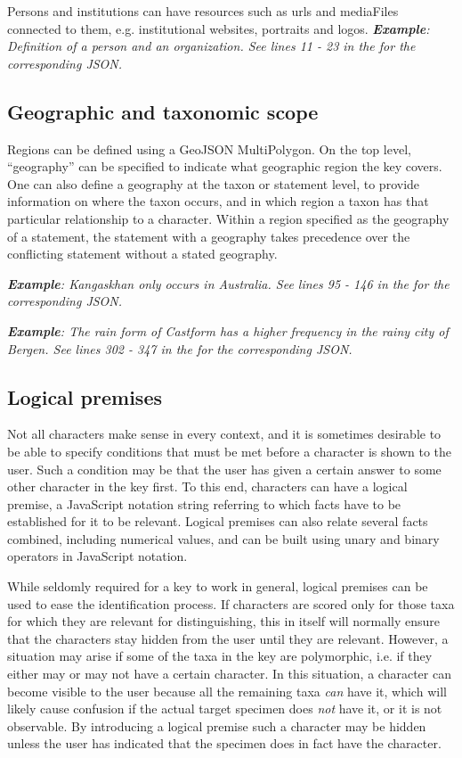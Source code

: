 \documentclass[10pt,letterpaper]{article}
\begin{document}
Persons and institutions can have resources such as urls and mediaFiles connected to them, e.g. institutional websites, portraits and logos.
\textit{\textbf{Example}: Definition of a person and an organization. See lines 11 - 23 in the  for the corresponding JSON.}
\subsection*{
Geographic and taxonomic scope
}
Regions can be defined using a GeoJSON MultiPolygon. On the top level, ``geography'' can be specified to indicate what geographic region the key covers. One can also define a geography at the taxon or statement level, to provide information on where the taxon occurs, and in which region a taxon has that particular relationship to a character. Within a region specified as the geography of a statement, the statement with a geography takes precedence over the conflicting statement without a stated geography.

\textit{\textbf{Example}: Kangaskhan only occurs in Australia. See lines 95 - 146 in the  for the corresponding JSON.}

\textit{\textbf{Example}: The rain form of Castform has a higher frequency in the rainy city of Bergen. See lines 302 - 347 in the  for the corresponding JSON.}
\subsection*{
Logical premises
}
Not all characters make sense in every context, and it is sometimes desirable to be able to specify conditions that must be met before a character is shown to the user. Such a condition may be that the user has given a certain answer to some other character in the key first. To this end, characters can have a logical premise, a JavaScript notation string referring to which facts have to be established for it to be relevant. Logical premises can also relate several facts combined, including numerical values, and can be built using unary and binary operators in JavaScript notation.

While seldomly required for a key to work in general, logical premises can be used to ease the identification process. If characters are scored only for those taxa for which they are relevant for distinguishing, this in itself will normally ensure that the characters stay hidden from the user until they are relevant. However, a situation may arise if some of the taxa in the key are polymorphic, i.e. if they either may or may not have a certain character. In this situation, a character can become visible to the user because all the remaining taxa \textit{can} have it, which will likely cause confusion if the actual target specimen does \textit{not} have it, or it is not observable. By introducing a logical premise such a character may be hidden unless the user has indicated that the specimen does in fact have the character.
\end{document}
